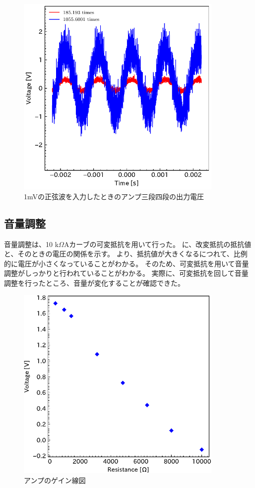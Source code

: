\documentclass[report.tex]{subfiles}
\begin{document}
\begin{figure}[H]
	\centering
	\includegraphics[width=10cm]{fig/level34_1m.pdf}
	\caption{1mVの正弦波を入力したときのアンプ三段四段の出力電圧}
	\label{fig:34_1m}
\end{figure}

\subsection{音量調整}

音量調整は、10 k\(\Omega\)Aカーブの可変抵抗を用いて行った。
に、改変抵抗の抵抗値と、そのときの電圧の関係を示す。
より、抵抗値が大きくなるにつれて、比例的に電圧が小さくなっていることがわかる。
そのため、可変抵抗を用いて音量調整がしっかりと行われていることがわかる。
実際に、可変抵抗を回して音量調整を行ったところ、音量が変化することが確認できた。

\begin{figure}[H]
	\centering
	\includegraphics[width=10cm]{fig/resi.pdf}
	\caption{アンプのゲイン線図}
	\label{fig:resi}
\end{figure}
\end{document}
